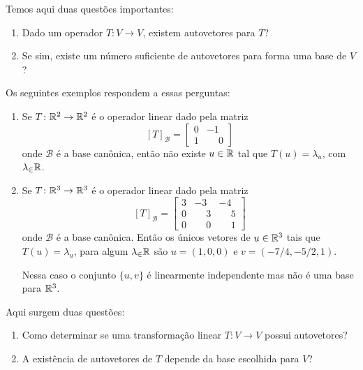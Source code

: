 Temos aqui duas questões importantes:
\begin{enumerate}
    \item Dado um operador $T \colon V \to V$, existem autovetores para $T$?

    \item Se sim, existe um número suficiente de autovetores para forma uma base de $V$?
\end{enumerate}

Os seguintes exemplos respondem a essas perguntas:

\begin{exemplos}
    \begin{enumerate}
        \item Se $T \colon \mathbb{R}^2 \to \mathbb{R}^2$ é o operador linear dado pela matriz
        \[
            [T]_\mathcal{B} = \begin{bmatrix}0 & -1\\1 & \phantom{-}0\end{bmatrix}
        \]
        onde $\mathcal{B}$ é a base canônica, então não existe $u \in \mathbb{R}$ tal que $T(u) = \lambda_u$, com $\lambda_\in \mathbb{R}$.

        \item Se $T \colon \mathbb{R}^3 \to \mathbb{R}^3$ é o operador linear dado pela matriz
        \[
        [T]_\mathcal{B} = \begin{bmatrix}3 & -3 & -4\\0 & \phantom{-}3 & \phantom{-}5\\0 & \phantom{-}0 & \phantom{-}1\end{bmatrix}
        \]
        onde $\mathcal{B}$ é a base canônica. Então os únicos vetores de $u \in \mathbb{R}^3$ tais que $T(u) = \lambda_u$, para algum $\lambda_\in \mathbb{R}$ são $u = (1, 0, 0)$ e $v = (-7/4, -5/2, 1)$.

        Nessa caso o conjunto $\{u, v\}$ é linearmente independente mas não é uma base para $\mathbb{R}^3$.
    \end{enumerate}
\end{exemplos}

Aqui surgem duas questões:
\begin{enumerate}
    \item Como determinar se uma transforma\c{c}ão linear $T \colon V \to V$ possui autovetores?

    \item A existência de autovetores de $T$ depende da base escolhida para $V$?
\end{enumerate}

